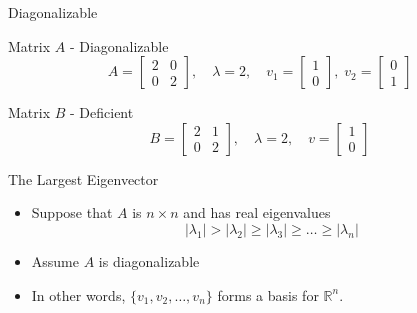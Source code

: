 \documentclass[10pt]{beamer}
\begin{document}
\begin{frame}[fragile]{Diagonalizable}


{
}

\begin{block}{Matrix $A$ - Diagonalizable}
     $$A = \begin{bmatrix}
        2 & 0\\ 0 & 2
    \end{bmatrix}, \quad \lambda = 2,\quad v_1 =\begin{bmatrix}
            1\\0
        \end{bmatrix},\; v_2=\begin{bmatrix}
            0\\1
        \end{bmatrix}$$
\end{block}
\begin{block}{Matrix $B$ - Deficient}
     $$B = \begin{bmatrix}
        2 & 1\\ 0 & 2
    \end{bmatrix}, \quad \lambda = 2,\quad v =\begin{bmatrix}
            1\\0
        \end{bmatrix}$$
\end{block}

\end{frame}


\begin{frame}{The Largest Eigenvector}
\begin{itemize}
    \item Suppose that \( A \) is \( n \times n \) and has real eigenvalues
    \[
    |\lambda_1| > |\lambda_2| \geq |\lambda_3| \geq \dots \geq |\lambda_n|
    \]
        \vfill 
    \item Assume $A$ is diagonalizable
        \vfill 
    \item In other words, \( \{v_1, v_2, \ldots, v_n\} \) forms a basis for \( \mathbb{R}^n \).
        \vfill
    
\end{itemize}
\end{frame}
\end{document}
